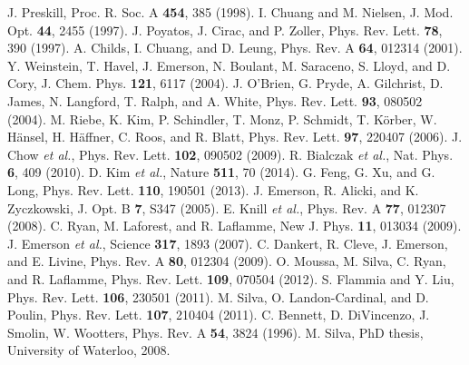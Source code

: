 \documentclass[prl,twocolumn,showpacs]{revtex4-1}
\begin{document}
\begin{thebibliography}{99}
 J. Preskill, Proc. R. Soc. A \textbf{454}, 385 (1998).
 I. Chuang and M. Nielsen, J. Mod. Opt. \textbf{44}, 2455 (1997).
 J. Poyatos, J. Cirac, and P. Zoller, Phys. Rev. Lett. \textbf{78}, 390 (1997).
 A. Childs, I. Chuang, and D. Leung, Phys. Rev. A \textbf{64}, 012314 (2001).
 Y. Weinstein, T. Havel, J. Emerson, N. Boulant, M. Saraceno, S. Lloyd, and D. Cory, J. Chem. Phys. \textbf{121}, 6117 (2004).
 J. O'Brien, G. Pryde, A. Gilchrist, D. James, N. Langford, T. Ralph, and A. White, Phys. Rev. Lett. \textbf{93}, 080502 (2004).
 M. Riebe, K. Kim, P. Schindler, T. Monz, P. Schmidt, T. K\"{o}rber, W. H\"{a}nsel, H. H\"{a}ffner, C. Roos, and R. Blatt, Phys. Rev. Lett. \textbf{97}, 220407 (2006).
 J. Chow \emph{et al.}, Phys. Rev. Lett. \textbf{102}, 090502 (2009).
 R. Bialczak \emph{et al.}, Nat. Phys. \textbf{6}, 409 (2010).
 D. Kim \emph{et al.}, Nature \textbf{511}, 70 (2014).
 G. Feng, G.  Xu, and G. Long,  Phys. Rev. Lett. \textbf{110}, 190501 (2013).
 J. Emerson, R. Alicki, and K. Zyczkowski, J. Opt. B \textbf{7}, S347 (2005).
 E. Knill \emph{et al.}, Phys. Rev. A \textbf{77}, 012307 (2008).
 C. Ryan, M. Laforest, and R. Laflamme, New J. Phys. \textbf{11}, 013034 (2009).
 J. Emerson \emph{et al.}, Science \textbf{317}, 1893 (2007).
 C. Dankert, R. Cleve, J. Emerson, and E. Livine, Phys. Rev. A \textbf{80}, 012304 (2009).
 O. Moussa, M. Silva, C. Ryan, and R. Laflamme, Phys. Rev. Lett. \textbf{109}, 070504 (2012).
 S. Flammia and Y. Liu, Phys. Rev. Lett. \textbf{106}, 230501 (2011).
 M. Silva, O. Landon-Cardinal, and D. Poulin, Phys. Rev. Lett. \textbf{107}, 210404 (2011).
 C. Bennett, D. DiVincenzo, J. Smolin, W. Wootters, Phys. Rev. A \textbf{54}, 3824 (1996).
 M. Silva, PhD thesis, University of Waterloo, 2008.

\end{thebibliography}
\end{document}
